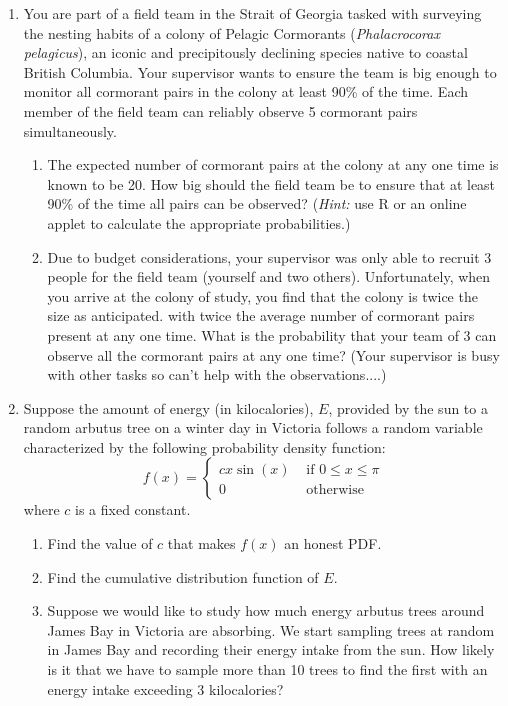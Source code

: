 \documentclass[11pt]{article}
\begin{document}
\begin{enumerate}[label=\textbf{Q \arabic*:},start=1]
\vspace*{3mm}

\item You are part of a field team in the Strait of Georgia tasked with surveying the nesting habits of a colony of Pelagic Cormorants ({\em Phalacrocorax pelagicus}), an iconic and precipitously declining species native to coastal British Columbia. Your supervisor wants to ensure the team is big enough to monitor all cormorant pairs in the colony at least 90\% of the time. Each member of the field team can reliably observe 5 cormorant pairs simultaneously. 
\begin{enumerate}
\item The expected number of cormorant pairs at the colony at any one time is known to be 20. How big should the field team be to ensure that at least 90\% of the time all pairs can be observed? 
({\em Hint:} use R or an online applet to calculate the appropriate probabilities.)

\item Due to budget considerations, your supervisor was only able to recruit 3 people for the field team (yourself and two others). Unfortunately, when you arrive at the colony of study, you find that the colony is twice the size as anticipated. with twice the average number of cormorant pairs present at any one time. What is the probability that your team of 3 can observe all the cormorant pairs at any one time? (Your supervisor is busy with other tasks so can't help with the observations....) 
\end{enumerate}




\item Suppose the amount of energy (in kilocalories), $E$, provided by the sun to a random arbutus tree on a winter day in Victoria follows a random variable characterized by the following probability density function:
\[
f(x) = \left\{
\begin{array}{ll}
cx\sin(x) & \mbox{ if } 0\leq x\leq \pi \\
0 & \mbox{ otherwise} 
\end{array}
\right.
\]
where $c$ is a fixed constant. 
\begin{enumerate}
  \item Find the value of $c$ that makes $f(x)$ an honest PDF.\\

  \item Find the cumulative distribution function of $E$.\\

  \item Suppose we would like to study how much energy arbutus trees around James Bay in Victoria are absorbing. We start sampling trees at random in James Bay and recording their energy intake from the sun. How likely is it that we have to sample more than 10 trees to find the first with an energy intake exceeding 3 kilocalories?


\end{enumerate}

\end{enumerate}
\end{document}
